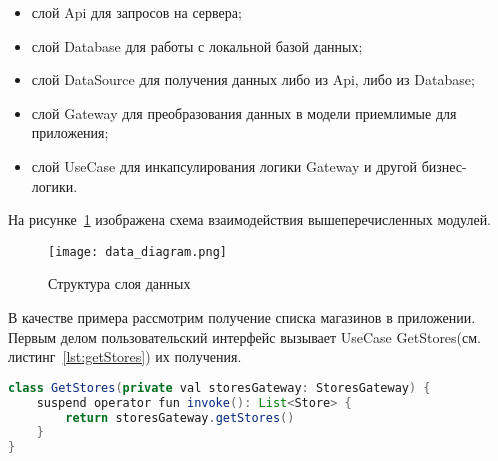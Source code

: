 \begin{itemize}
  \item слой Api для запросов на сервера;
  \item слой Database для работы с локальной базой данных;
  \item слой DataSource для получения данных либо из Api, либо из Database;
  \item слой Gateway для преобразования данных в модели приемлимые для приложения;
  \item слой UseCase для инкапсулирования логики Gateway и другой бизнес-логики.
\end{itemize}

На рисунке~\ref{fig:arch:data_diagram} изображена схема взаимодействия вышеперечисленных модулей.
 
\begin{figure}[H]
 \centering
   \texttt{[image: data\_diagram.png]} 
   \caption{Структура слоя данных}
   \label{fig:arch:data_diagram}
\end{figure}
 
В качестве примера рассмотрим получение списка магазинов в приложении. Первым делом пользовательский интерфейс вызывает UseCase GetStores(см. листинг~\ref{lst:getStores}) их получения.

\begin{lstlisting}[language=Java,label={lst:getStores},caption={UseCase GetStores}]
class GetStores(private val storesGateway: StoresGateway) {
    suspend operator fun invoke(): List<Store> {
        return storesGateway.getStores()
    }
}
\end{lstlisting}

